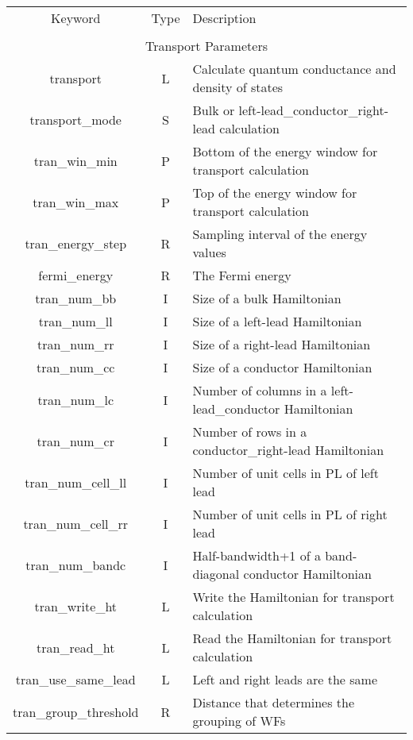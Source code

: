 \begin{table}
\begin{center}
\begin{tabular}{|c|c|p{6cm}|}
\hline
Keyword & Type & Description \\
        &      &             \\
\hline\hline
\multicolumn{3}{|c|}{Transport Parameters} \\
\hline
{\sc transport}   & L & Calculate quantum conductance and density of states \\
{\sc transport\_mode }  & S & Bulk or left-lead\_conductor\_right-lead calculation \\
{\sc tran\_win\_min } & P &  Bottom of the energy window for transport calculation\\
{\sc tran\_win\_max } & P &  Top of the energy window for transport calculation\\
{\sc tran\_energy\_step } & R & Sampling interval of the energy values \\
{\sc fermi\_energy } & R & The Fermi energy \\
{\sc tran\_num\_bb } & I & Size of a bulk Hamiltonian \\
{\sc tran\_num\_ll } & I & Size of a left-lead Hamiltonian \\
{\sc tran\_num\_rr } & I & Size of a right-lead Hamiltonian \\
{\sc tran\_num\_cc } & I & Size of a conductor Hamiltonian \\
{\sc tran\_num\_lc } & I & Number of columns in a left-lead\_conductor Hamiltonian \\
{\sc tran\_num\_cr } & I & Number of rows in a conductor\_right-lead Hamiltonian \\
{\sc tran\_num\_cell\_ll } & I & Number of unit cells in PL of left lead \\
{\sc tran\_num\_cell\_rr } & I & Number of unit cells in PL of right lead \\
{\sc tran\_num\_bandc } & I & Half-bandwidth+1 of a band-diagonal conductor Hamiltonian \\
{\sc tran\_write\_ht } & L & Write the Hamiltonian for transport calculation \\
{\sc tran\_read\_ht } & L & Read the Hamiltonian for transport calculation \\
{\sc tran\_use\_same\_lead } & L & Left and right leads are the same \\
{\sc tran\_group\_threshold } & R & Distance that determines the grouping of WFs \\

\end{tabular}
\end{center}
\end{table}
